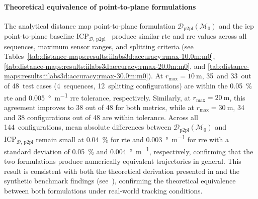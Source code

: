 \paragraph{Theoretical equivalence of point-to-plane formulations}
The analytical distance map point-to-plane formulation
$\mathcal{D}_\mathrm{p2pl}(\mathcal{M}_0)$ and the \gls{icp} point-to-plane
baseline $\mathrm{ICP}_{\mathcal{D},\,\mathrm{p2pl}}$~\cite{chen-medioni:icra:1991}
produce similar \gls{rte} and \gls{rre} values across all sequences,
maximum sensor ranges, and splitting criteria
(see Tables~\ref{tab:distance-maps:results:iilabs3d:accuracy:rmax-10.0m:m0},
\ref{tab:distance-maps:results:iilabs3d:accuracy:rmax-20.0m:m0}, and
\ref{tab:distance-maps:results:iilabs3d:accuracy:rmax-30.0m:m0}).
At $r_\mathrm{max} = \SI{10}{\metre}$, 35~and 33~out of 48~test cases
(4~sequences, 12~splitting configurations)
are within the \SI{0.05}{\percent} \gls{rte} and \SI{0.005}{\degree\per\metre}
\gls{rre} tolerance, respectively. Similarly,
at $r_\mathrm{max} = \SI{20}{\metre}$, this agreement improves to 38 out of 48
for both metrics, while at $r_\mathrm{max} = \SI{30}{\metre}$,
34 and 38 configurations out of 48 are within tolerance.
Across all 144~configurations, mean absolute differences between
$\mathcal{D}_\mathrm{p2pl}(\mathcal{M}_0)$ and
$\mathrm{ICP}_{\mathcal{D},\,\mathrm{p2pl}}$ remain small at
\SI{0.04}{\percent} for \gls{rte} and \SI{0.003}{\degree\per\metre} for
\gls{rre} with a standard deviation of \SI{0.05}{\percent} and
\SI{0.004}{\degree\per\metre}, respectively, confirming that the two
formulations produce numerically equivalent trajectories in general.
This result is consistent with both the theoretical derivation presented in
 and the synthetic benchmark findings
(see~), confirming the
theoretical equivalence between both formulations under real-world tracking
conditions.

